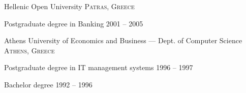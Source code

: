 \documentclass[10pt,a4paper]{article} %
\begin{document}

\spacedhrule{-0.2em}{-0.4em} %




\headedsection
{Hellenic Open University}
{\textsc{Patras, Greece}} {

\headedsubsection
{Postgraduate degree in Banking}
{2001 -- 2005}
{\bodytext{
  }
}}



\headedsection %
{Athens University of Economics and Business --- Dept. of Computer Science}
{\textsc{Athens, Greece}}
{

\headedsubsection %
{Postgraduate degree in IT management systems}
{1996 -- 1997}
{\bodytext{
  }}





\headedsubsection
{Bachelor degree}
{1992 -- 1996}
{\bodytext{
  }}
}



\spacedhrule{0.5em}{-0.4em} %




\end{document}
